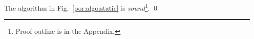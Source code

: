 \begin{theorem}
The algorithm in Fig.~\ref{por:algo:static} is 
\emph{sound}\footnote{Proof outline is in the Appendix.}. 
\qed
\end{theorem}











